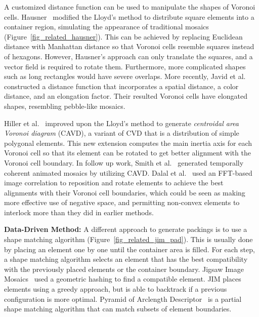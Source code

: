 \newtext
{
A customized distance function can be used to manipulate the shapes of Voronoi cells.
Hausner~\cite{Hausner2001} modified the Lloyd's method to distribute square elements into a container 
region, simulating the appearance of traditional mosaics (Figure~\ref{fig_related_hausner}). 
This can be achieved by replacing Euclidean distance with Manhattan distance so that Voronoi cells resemble squares instead of hexagons.
However, Hausner's approach can only translate the squares, and a vector field is required to rotate them.
Furthermore, more complicated shapes such as long rectangles would have severe overlaps.
More recently, Javid et al.~\cite{Javid2019} constructed a distance function that 
incorporates a spatial distance, a color distance, and an elongation factor. Their resulted
Voronoi cells have elongated shapes, resembling pebble-like mosaics.}

\newtext
{Hiller et al.~\cite{Hiller2003} improved upon the Lloyd's method to generate \textit{centroidal area Voronoi diagram} (CAVD),
a variant of CVD that is a distribution of simple polygonal elements.
This new extension computes the main inertia axis for each Voronoi cell so that 
its element can be rotated to get better alignment with the Voronoi cell boundary.
In follow up work, Smith et al.~\cite{Smith2005} generated temporally coherent animated mosaics by utilizing CAVD.
Dalal et al.~\cite{Dalal2006} used an FFT-based image correlation to reposition
and rotate elements to achieve the best alignments with their Voronoi cell boundaries, 
which could be seen as making more effective use of negative
space, and permitting non-convex elements to interlock more than they did in
earlier methods.
}

\newtext
{
\textbf{Data-Driven Method:} 
A different approach to generate packings is to use a shape matching algorithm (Figure~\ref{fig_related_jim_pad}).
This is usually done by placing an element one by one until the container area is filled.
For each step, a shape matching algorithm selects an 
element that has the best compatibility with the previously placed elements or the container boundary.
Jigsaw Image Mosaics~\cite{Kim2002} used a geometric hashing to find
a compatible element. JIM places elements using a greedy approach, but is able to backtrack 
if a previous configuration is more optimal.
Pyramid of Arclength Descriptor~\cite{Kwan2016} is
a partial shape matching algorithm that can match
subsets of element boundaries.
}

